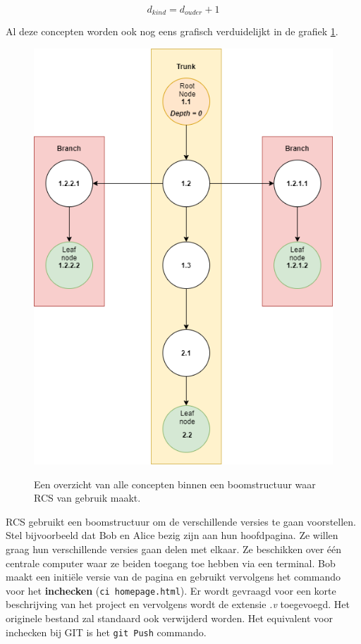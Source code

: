 \begin{equation}
	d_{kind} = d_{ouder} + 1
\end{equation}

Al deze concepten worden ook nog eens grafisch verduidelijkt in de grafiek \ref{fig:tree1}.

\begin{figure}
\centering
  	\includegraphics[scale=0.5]{tree1.png}
	\label{fig:tree1}
\caption[Overzicht concepten boomstructuur]{Een overzicht van alle concepten binnen een boomstructuur waar RCS van gebruik maakt.}
\end{figure}

RCS gebruikt een boomstructuur om de verschillende versies te gaan voorstellen. Stel bijvoorbeeld dat Bob en Alice bezig zijn aan hun hoofdpagina. Ze willen graag hun verschillende versies gaan delen met elkaar. Ze beschikken over één centrale computer waar ze beiden toegang toe hebben via een terminal. Bob maakt een initiële versie van de pagina en gebruikt vervolgens het commando voor het \textbf{inchecken} (\Verb+ci homepage.html+). Er wordt gevraagd voor een korte beschrijving van het project en vervolgens wordt de extensie \textit{.v} toegevoegd. Het originele bestand zal standaard ook verwijderd worden. Het equivalent voor inchecken bij GIT is het \verb+git Push+ commando.\\

